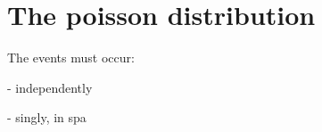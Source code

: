 \documentclass{article}
\begin{document}
\section{The poisson distribution}

The events must occur:

- independently

- singly, in spa
\end{document}
